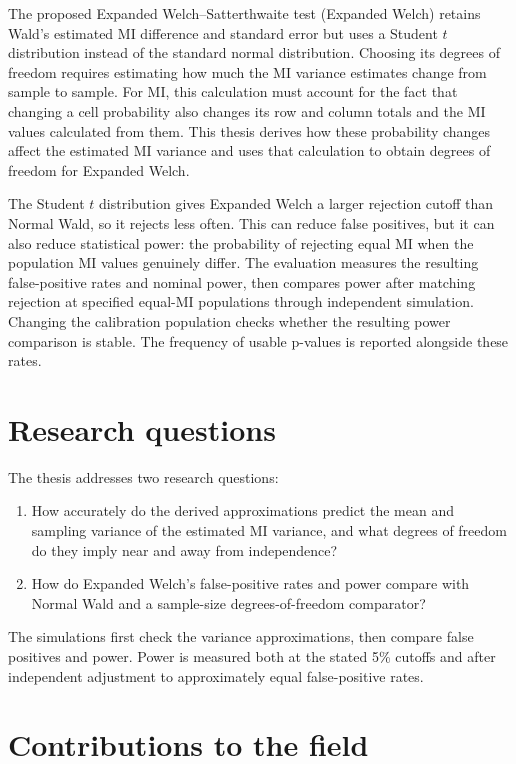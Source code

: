The proposed Expanded Welch--Satterthwaite test (Expanded Welch) retains
Wald's estimated MI difference and standard error but uses a Student
\(t\) distribution instead of the standard normal distribution. Choosing
its degrees of freedom requires estimating how much the MI variance
estimates change from sample to sample. For MI, this calculation must
account for the fact that changing a cell probability also changes its
row and column totals and the MI values calculated from them. This thesis
derives how these probability changes affect the estimated MI variance
and uses that calculation to obtain degrees of freedom for Expanded Welch.

The Student \(t\) distribution gives Expanded Welch a larger rejection
cutoff than Normal Wald, so it rejects less often. This can reduce false
positives, but it can also reduce statistical power: the probability of
rejecting equal MI when the population MI values genuinely differ.
The evaluation measures the resulting false-positive rates and nominal
power, then compares power after matching rejection at specified equal-MI
populations through independent simulation. Changing the calibration
population checks whether the resulting power comparison is stable.
The frequency of usable p-values is reported alongside these rates.

\section{Research questions}
\label{sec:research-questions}

The thesis addresses two research questions:
\begin{enumerate}
 \item How accurately do the derived approximations predict the mean and
 sampling variance of the estimated MI variance, and what degrees of
 freedom do they imply near and away from independence?
 \item How do Expanded Welch's false-positive rates and power compare
 with Normal Wald and a sample-size degrees-of-freedom comparator?
\end{enumerate}

The simulations first check the variance approximations, then compare
false positives and power. Power is measured both at the stated 5\%
cutoffs and after independent adjustment to approximately equal
false-positive rates.

\section{Contributions to the field}

